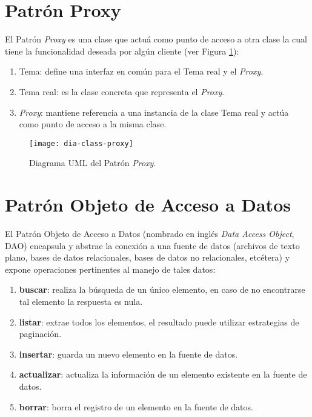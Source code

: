 \section{Patrón Proxy}\label{sec:proxy}
El Patrón \textit{Proxy} es una clase que actuá como punto de acceso a otra clase la cual tiene la funcionalidad deseada por algún cliente\cite{DesignPatternsLasater} (ver Figura \ref{fig:dia-class-proxy}):
\begin{enumerate}
  \item Tema: define una interfaz en común para el Tema real y el \textit{Proxy}.
  \item Tema real: es la clase concreta que representa el \textit{Proxy}.
  \item \textit{Proxy}: mantiene referencia a una instancia de la clase Tema real y actúa como punto de acceso a la misma clase.
\end{enumerate}
\begin{figure}[h]
  \centering
  \texttt{[image: dia-class-proxy]}
  \caption{Diagrama UML del Patrón \textit{Proxy}\cite{DesignPatternsLasater}.}
  \label{fig:dia-class-proxy}
\end{figure}

\section{Patrón Objeto de Acceso a Datos}\label{sec:dao}
El Patrón Objeto de Acceso a Datos (nombrado en inglés \textit{Data Access Object}, DAO) encapsula y abstrae la conexión a una fuente de datos (archivos de texto plano, bases de datos relacionales, bases de datos no relacionales, etcétera) y expone operaciones pertinentes al manejo de tales datos\cite{OCPJavaSE7,OCAPJavaSE7}:
\begin{enumerate}
	\item [] \textbf{buscar}: realiza la búsqueda de un único elemento, en caso de no encontrarse tal elemento la respuesta es nula.
	\item [] \textbf{listar}: extrae todos los elementos, el resultado puede utilizar estrategias de paginación.
	\item [] \textbf{insertar}: guarda un nuevo elemento en la fuente de datos.
	\item [] \textbf{actualizar}: actualiza la información de un elemento existente en la fuente de datos.
	\item [] \textbf{borrar}: borra el registro de un elemento en la fuente de datos.
\end{enumerate}


